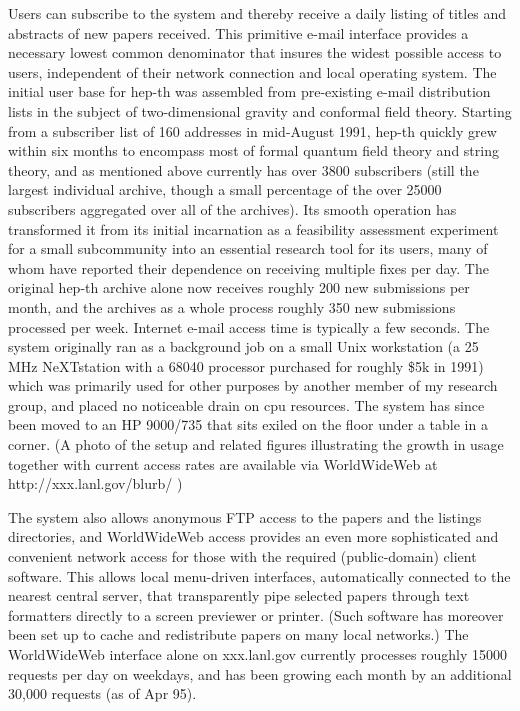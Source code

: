 Users can subscribe to the system and thereby receive a daily listing of titles
and abstracts of new papers received. This primitive e-mail
interface provides a necessary lowest common denominator that insures the
widest possible access to users, independent of their network connection and
local operating system.
The initial user base for hep-th was assembled from pre-existing e-mail
distribution lists in the subject of two-dimensional gravity and conformal
field theory. Starting from a subscriber list of 160 addresses in mid-August
1991, hep-th quickly grew within six months to encompass most of formal quantum
field theory and string theory, and as mentioned above currently has over 3800
subscribers (still the largest individual archive, though a small percentage of
the over 25000 subscribers aggregated over all of the archives).
Its smooth operation has transformed it from its initial
incarnation as a feasibility assessment experiment for a small subcommunity
into an essential research tool for its users, many of whom have reported their
dependence on receiving multiple fixes per day. The original hep-th archive
alone now receives roughly 200 new submissions per month, and the archives
as a whole process roughly 350 new submissions processed per week.
Internet e-mail access time is typically a few seconds. The system
originally ran as a background job on a small Unix workstation (a 25 MHz
NeXTstation with a 68040 processor purchased for roughly \$5k in 1991) which
was primarily used for other purposes by another member of my research group,
and placed no noticeable drain on cpu resources. The system has since been
moved to an HP 9000/735 that sits exiled on the floor under a table in a
corner. (A photo of the setup and related figures illustrating the growth
in usage together with  current access rates are available via WorldWideWeb
at http://xxx.lanl.gov/blurb/ )

The system also allows anonymous FTP access to the papers and the listings
directories, and WorldWideWeb access provides an even more sophisticated and
convenient
network access for those with the required (public-domain) client software.
This allows local menu-driven interfaces, automatically connected to
the nearest central server, that transparently pipe selected papers through
text formatters directly to a screen previewer or printer. (Such software has
moreover been set up to cache and redistribute papers on many local networks.)
The WorldWideWeb interface alone on xxx.lanl.gov currently processes roughly
15000 requests per day on weekdays, and has been growing each month by an
additional 30,000 requests (as of Apr 95).

